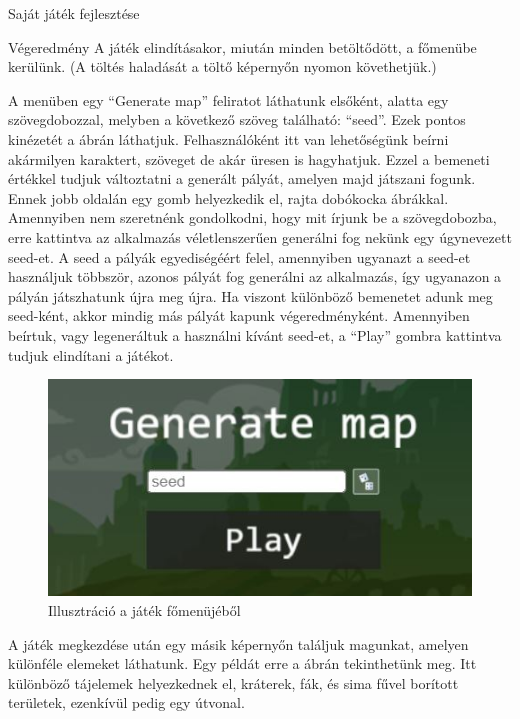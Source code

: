 \begin{MyChapter}{Saját játék fejlesztése}
\begin{MySection}{Végeredmény}
		A játék elindításakor, miután minden betöltődött, a főmenübe kerülünk. (A töltés haladását a töltő képernyőn nyomon követhetjük.)

		A menüben egy ``Generate map'' feliratot láthatunk elsőként, alatta egy szövegdobozzal, melyben a következő szöveg található: ``seed''. Ezek pontos kinézetét a  ábrán láthatjuk. Felhasználóként itt van lehetőségünk beírni akármilyen karaktert, szöveget de akár üresen is hagyhatjuk. Ezzel a bemeneti értékkel tudjuk változtatni a generált pályát, amelyen majd játszani fogunk.
		Ennek jobb oldalán egy gomb helyezkedik el, rajta dobókocka ábrákkal. Amennyiben nem szeretnénk gondolkodni, hogy mit írjunk be a szövegdobozba, erre kattintva az alkalmazás véletlenszerűen generálni fog nekünk egy úgynevezett seed-et.
		A seed a pályák egyediségéért felel, amennyiben ugyanazt a seed-et használjuk többször, azonos pályát fog generálni az alkalmazás, így ugyanazon a pályán játszhatunk újra meg újra. Ha viszont különböző bemenetet adunk meg seed-ként, akkor mindig más pályát kapunk végeredményként. 
		Amennyiben beírtuk, vagy legeneráltuk a használni kívánt seed-et, a ``Play'' gombra kattintva tudjuk elindítani a játékot.
		
		\begin{figure}[H]
			\centering
			\includegraphics[scale=0.68]{kepek/jatekHasznalat/fomenu}
			\caption{Illusztráció a játék főmenüjéből}
			\label{fig:jatekHasznalat:fomenu}
		\end{figure}
		
		A játék megkezdése után egy másik képernyőn találjuk magunkat, amelyen különféle elemeket láthatunk. Egy példát erre a  ábrán tekinthetünk meg. Itt különböző tájelemek helyezkednek el, kráterek, fák, és sima fűvel borított területek, ezenkívül pedig egy útvonal. 
		

\end{MySection}
\end{MyChapter}
